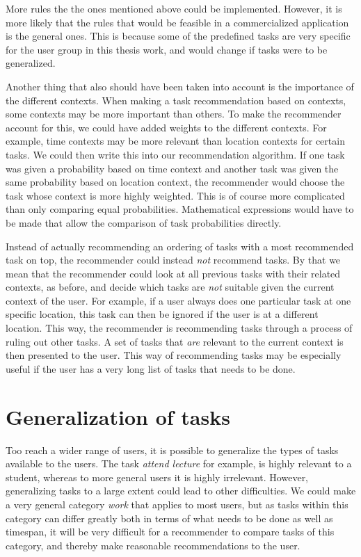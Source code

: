 More rules the the ones mentioned above could be implemented. However, it is more likely that the rules that would be feasible in a commercialized application is the general ones. This is because some of the predefined tasks are very specific for the user group in this thesis work, and would change if tasks were to be generalized.

Another thing that also should have been taken into account is the importance of the different contexts. When making a task recommendation based on contexts, some contexts may be more important than others. To make the recommender account for this, we could have added weights to the different contexts. For example, time contexts may be more relevant than location contexts for certain tasks. We could then write this into our recommendation algorithm. If one task was given a probability based on time context and another task was given the same probability based on location context, the recommender would choose the task whose context is more highly weighted. This is of course more complicated than only comparing equal probabilities. Mathematical expressions would have to be made that allow the comparison of task probabilities directly. 

Instead of actually recommending an ordering of tasks with a most recommended task on top, the recommender could instead \emph{not} recommend tasks. By that we mean that the recommender could look at all previous tasks with their related contexts, as before, and decide which tasks are \emph{not} suitable given the current context of the user. For example, if a user always does one particular task at one specific location, this task can then be ignored if the user is at a different location. This way, the recommender is recommending tasks through a process of ruling out other tasks. A set of tasks that \emph{are} relevant to the current context is then presented to the user. This way of recommending tasks may be especially useful if the user has a very long list of tasks that needs to be done.



\section{Generalization of tasks}
Too reach a wider range of users, it is possible to generalize the types of tasks available to the users. The task \emph{attend lecture} for example, is highly relevant to a student, whereas to more general users it is highly irrelevant. However, generalizing tasks to a large extent could lead to other difficulties. We could make a very general category \emph{work} that applies to most users, but as tasks within this category can differ greatly both in terms of what needs to be done as well as timespan, it will be very difficult for a recommender to compare tasks of this category, and thereby make reasonable recommendations to the user.

